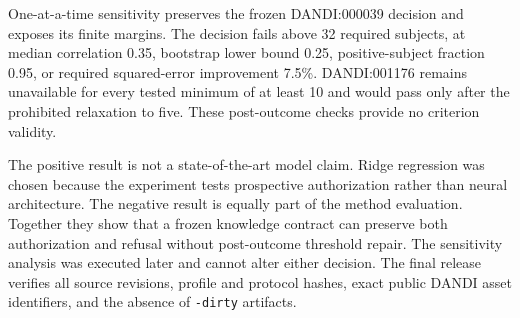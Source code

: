 

One-at-a-time sensitivity preserves the frozen DANDI:000039 decision and exposes its finite margins. The decision fails above 32 required subjects, at median correlation 0.35, bootstrap lower bound 0.25, positive-subject fraction 0.95, or required squared-error improvement 7.5\%. DANDI:001176 remains unavailable for every tested minimum of at least 10 and would pass only after the prohibited relaxation to five. These post-outcome checks provide no criterion validity.


\FloatBarrier

The positive result is not a state-of-the-art model claim. Ridge regression was chosen because the experiment tests prospective authorization rather than neural architecture. The negative result is equally part of the method evaluation. Together they show that a frozen knowledge contract can preserve both authorization and refusal without post-outcome threshold repair. The sensitivity analysis was executed later and cannot alter either decision. The final release verifies all source revisions, profile and protocol hashes, exact public DANDI asset identifiers, and the absence of \texttt{-dirty} artifacts.


